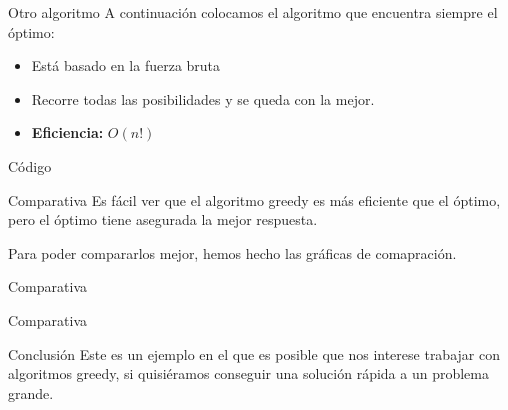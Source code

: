 \begin{frame}{Otro algoritmo}
	A continuación colocamos el algoritmo que encuentra siempre el óptimo:
	
	\begin{itemize}
		\item Está basado en la fuerza bruta
		\item Recorre todas las posibilidades y se queda con la mejor.
		\item \textbf{Eficiencia:} $O(n!)$
	\end{itemize}	
\end{frame}

\begin{frame}[fragile]{Código}
	
\end{frame}

\begin{frame}{Comparativa}
	Es fácil ver que el algoritmo greedy es más eficiente que el óptimo, pero el óptimo tiene asegurada la mejor respuesta.
	
	Para poder compararlos mejor, hemos hecho las gráficas de comapración.
\end{frame}

\begin{frame}{Comparativa}
\end{frame}

\begin{frame}{Comparativa}
\end{frame}

\begin{frame}{Conclusión}
	Este es un ejemplo en el que es posible que nos interese trabajar con algoritmos greedy, si quisiéramos conseguir una solución rápida a un problema grande.
\end{frame}


